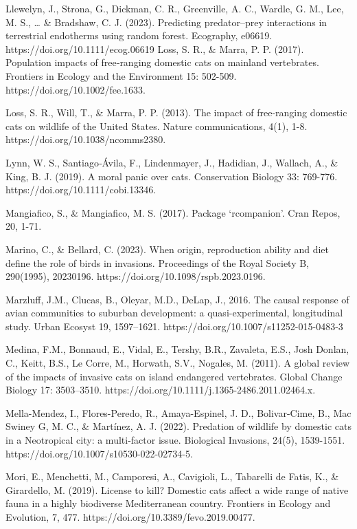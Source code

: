 \documentclass[
  super,
  review,
  3p]{elsarticle}
\begin{document}
Llewelyn, J., Strona, G., Dickman, C. R., Greenville, A. C., Wardle, G.
M., Lee, M. S., \ldots{} \& Bradshaw, C. J. (2023). Predicting
predator--prey interactions in terrestrial endotherms using random
forest. Ecography, e06619. https://doi.org/10.1111/ecog.06619 Loss, S.
R., \& Marra, P. P. (2017). Population impacts of free‐ranging domestic
cats on mainland vertebrates. Frontiers in Ecology and the Environment
15: 502-509. https://doi.org/10.1002/fee.1633.

Loss, S. R., Will, T., \& Marra, P. P. (2013). The impact of
free-ranging domestic cats on wildlife of the United States. Nature
communications, 4(1), 1-8. https://doi.org/10.1038/ncomms2380.

Lynn, W. S., Santiago‐Ávila, F., Lindenmayer, J., Hadidian, J., Wallach,
A., \& King, B. J. (2019). A moral panic over cats. Conservation Biology
33: 769-776. https://doi.org/10.1111/cobi.13346.

Mangiafico, S., \& Mangiafico, M. S. (2017). Package `rcompanion'. Cran
Repos, 20, 1-71.

Marino, C., \& Bellard, C. (2023). When origin, reproduction ability and
diet define the role of birds in invasions. Proceedings of the Royal
Society B, 290(1995), 20230196. https://doi.org/10.1098/rspb.2023.0196.

Marzluff, J.M., Clucas, B., Oleyar, M.D., DeLap, J., 2016. The causal
response of avian communities to suburban development: a
quasi-experimental, longitudinal study. Urban Ecosyst 19, 1597--1621.
https://doi.org/10.1007/s11252-015-0483-3

Medina, F.M., Bonnaud, E., Vidal, E., Tershy, B.R., Zavaleta, E.S., Josh
Donlan, C., Keitt, B.S., Le Corre, M., Horwath, S.V., Nogales, M.
(2011). A global review of the impacts of invasive cats on island
endangered vertebrates. Global Change Biology 17: 3503--3510.
https://doi.org/10.1111/j.1365-2486.2011.02464.x.

Mella-Mendez, I., Flores-Peredo, R., Amaya-Espinel, J. D., Bolivar-Cime,
B., Mac Swiney G, M. C., \& Martínez, A. J. (2022). Predation of
wildlife by domestic cats in a Neotropical city: a multi-factor issue.
Biological Invasions, 24(5), 1539-1551.
https://doi.org/10.1007/s10530-022-02734-5.

Mori, E., Menchetti, M., Camporesi, A., Cavigioli, L., Tabarelli de
Fatis, K., \& Girardello, M. (2019). License to kill? Domestic cats
affect a wide range of native fauna in a highly biodiverse Mediterranean
country. Frontiers in Ecology and Evolution, 7, 477.
https://doi.org/10.3389/fevo.2019.00477.
\end{document}
